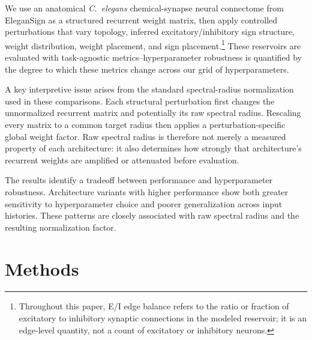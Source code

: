 \documentclass[a4paper,fleqn]{style_neural_networks/cas-dc}
\let\parencite\citep
\begin{document}
We use an anatomical \textit{C.\ elegans} chemical-synapse neural connectome from EleganSign \parencite{fenyves_szilágyi_zsolt_vassy_csaba_2020,elegansign_web} as a structured recurrent weight matrix, then apply controlled perturbations that vary topology, inferred excitatory/inhibitory sign structure, weight distribution, weight placement, and sign placement.\footnote{Throughout this paper, E/I edge balance refers to the ratio or fraction of excitatory to inhibitory synaptic connections in the modeled reservoir; it is an edge-level quantity, not a count of excitatory or inhibitory neurons.} These reservoirs are evaluated with task-agnostic metrics--hyperparameter robustness is quantified by the degree to which these metrics change across our grid of hyperparameters.

A key interpretive issue arises from the standard spectral-radius normalization used in these comparisons. Each structural perturbation first changes the unnormalized recurrent matrix and potentially its raw spectral radius. Rescaling every matrix to a common target radius then applies a perturbation-specific global weight factor. Raw spectral radius is therefore not merely a measured property of each architecture: it also determines how strongly that architecture's recurrent weights are amplified or attenuated before evaluation.

The results identify a tradeoff between performance and hyperparameter robustness. Architecture variants with higher performance show both greater sensitivity to hyperparameter choice and poorer generalization across input histories. These patterns are closely associated with raw spectral radius and the resulting normalization factor.

\section{Methods}
\label{sec:methods}
\end{document}
